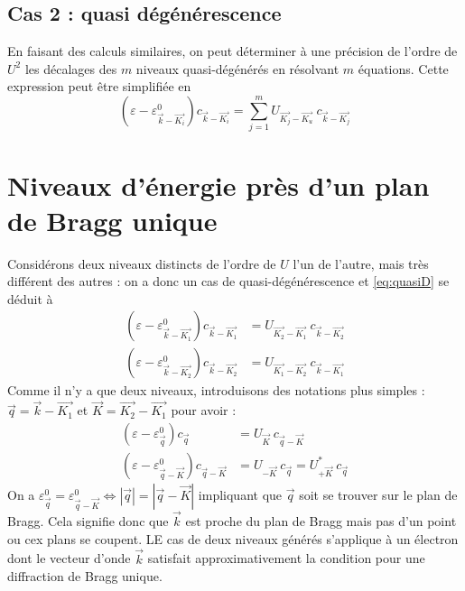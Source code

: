		
		\subsection{Cas 2 : quasi dégénérescence}
		En faisant des calculs similaires, on peut déterminer à une précision de 
		l'ordre de $U^2$ les décalages des $m$ niveaux quasi-dégénérés en résolvant 
		$m$ équations. Cette expression peut être simplifiée en 
		\begin{equation}
		\left(\varepsilon-\varepsilon_{\vec{k}-\vec{K_i}}^0\right)c_{\vec{k}-\vec{K_i}} =
		\sum_{j=1}^m U_{\vec{K_j}-\vec{K_u}}\ c_{\vec{k}-\vec{K_j}}
		\label{eq:quasiD}
		\end{equation}
		
	\section{Niveaux d'énergie près d'un plan de Bragg unique}
	Considérons deux niveaux distincts de l'ordre de $U$ l'un de l'autre, mais très 
	différent des autres : on a donc un cas de quasi-dégénérescence et \autoref{eq:quasiD} 
	se déduit à 
	\begin{equation}
	\begin{array}{ll}
	\left(\varepsilon-\varepsilon_{\vec{k}-\vec{K_1}}^0\right)c_{\vec{k}-\vec{K_1}} &=
	U_{\vec{K_2}-\vec{K_1}}\ c_{\vec{k}-\vec{K_2}}\\
	\left(\varepsilon-\varepsilon_{\vec{k}-\vec{K_2}}^0\right)c_{\vec{k}-\vec{K_2}} &=
	U_{\vec{K_1}-\vec{K_2}}\ c_{\vec{k}-\vec{K_1}}	
	\end{array}
	\end{equation}
	Comme il n'y a que deux niveaux, introduisons des notations plus simples :
	$\vec{q} = \vec{k}-\vec{K_1}$ et $\vec{K}=\vec{K_2}-\vec{K_1}$ pour avoir :
	\begin{equation}
	\begin{array}{ll}
	\left(\varepsilon-\varepsilon_{\vec{q}}^0\right)c_{\vec{q}} &= U_{\vec{K}}\ c_{
	\vec{q}-\vec{K}}\\
	\left(\varepsilon-\varepsilon_{\vec{q}-\vec{K}}^0\right)c_{\vec{q}-\vec{K}} &= 
	U_{-\vec{K}}\ c_{\vec{q}} = U_{+\vec{K}}^*\ c_{\vec{q}}
	\end{array}	
	\end{equation}
	On a $\varepsilon_{\vec{q}}^0=\varepsilon_{\vec{q}-\vec{K}}^0 \Leftrightarrow |
	\vec{q}|=|\vec{q}-\vec{K}|$ impliquant que $\vec{q}$ soit se trouver sur le plan 
	de Bragg. Cela signifie donc que $\vec{k}$ est proche du plan de Bragg mais pas 
	d'un point ou cex plans se coupent. LE cas de deux niveaux générés s'applique à 
	un électron dont le vecteur d'onde $\vec{k}$ satisfait approximativement la 
	condition pour une diffraction de Bragg unique.\\
	
